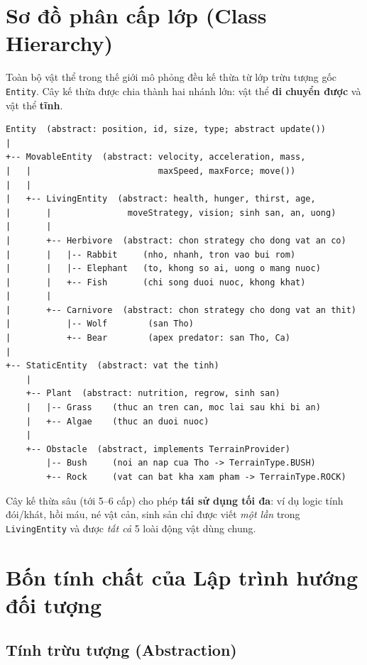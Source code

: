 \documentclass[12pt,a4paper]{report}
\newcommand{\keyword}[1]{\textcolor{primaryblue}{\textbf{#1}}}
\newcommand{\code}[1]{\texttt{\small #1}}
\newcommand{\note}[1]{%
  \begin{mdframed}[backgroundcolor=infobg,linecolor=primaryblue,linewidth=0.8pt,
                   roundcorner=4pt,skipabove=6pt,skipbelow=6pt]#1\end{mdframed}}
\begin{document}
\section{Sơ đồ phân cấp lớp (Class Hierarchy)}

Toàn bộ vật thể trong thế giới mô phỏng đều kế thừa từ lớp trừu tượng gốc \code{Entity}. Cây kế thừa được chia thành hai nhánh lớn: vật thể \keyword{di chuyển được} và vật thể \keyword{tĩnh}.

\begin{lstlisting}[style=pseudostyle, caption={Phân cấp lớp Entity (vật thể sống và di chuyển)}]
Entity  (abstract: position, id, size, type; abstract update())
|
+-- MovableEntity  (abstract: velocity, acceleration, mass,
|   |                         maxSpeed, maxForce; move())
|   |
|   +-- LivingEntity  (abstract: health, hunger, thirst, age,
|       |               moveStrategy, vision; sinh san, an, uong)
|       |
|       +-- Herbivore  (abstract: chon strategy cho dong vat an co)
|       |   |-- Rabbit     (nho, nhanh, tron vao bui rom)
|       |   |-- Elephant   (to, khong so ai, uong o mang nuoc)
|       |   +-- Fish       (chi song duoi nuoc, khong khat)
|       |
|       +-- Carnivore  (abstract: chon strategy cho dong vat an thit)
|           |-- Wolf        (san Tho)
|           +-- Bear        (apex predator: san Tho, Ca)
|
+-- StaticEntity  (abstract: vat the tinh)
    |
    +-- Plant  (abstract: nutrition, regrow, sinh san)
    |   |-- Grass    (thuc an tren can, moc lai sau khi bi an)
    |   +-- Algae    (thuc an duoi nuoc)
    |
    +-- Obstacle  (abstract, implements TerrainProvider)
        |-- Bush     (noi an nap cua Tho -> TerrainType.BUSH)
        +-- Rock     (vat can bat kha xam pham -> TerrainType.ROCK)
\end{lstlisting}

\note{Cây kế thừa sâu (tới 5--6 cấp) cho phép \textbf{tái sử dụng tối đa}: ví dụ logic tính đói/khát, hồi máu, né vật cản, sinh sản chỉ được viết \emph{một lần} trong \code{LivingEntity} và được \emph{tất cả} 5 loài động vật dùng chung.}

\section{Bốn tính chất của Lập trình hướng đối tượng}

\subsection{Tính trừu tượng (Abstraction)}
\end{document}
